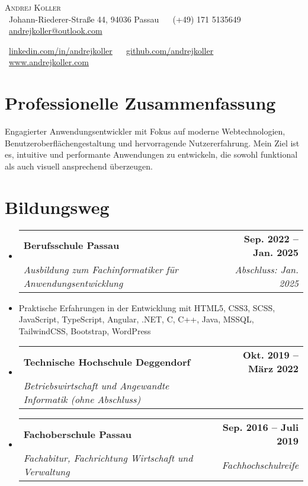 \documentclass[letterpaper,11pt]{article}
\makeatletter
\newcommand{\resumeItem}[1]{
  \item\small{
    {#1 \vspace{0pt}}
  }
}
\newcommand{\resumeSubheading}[4]{
  \vspace{-2pt}\item
  \begin{tabular*}{1.0\textwidth}[t]{l@{\extracolsep{\fill}}r}
    \textbf{#1} & \textbf{\small #2} \\
    \textit{\small#3} & \textit{\small #4} \\
  \end{tabular*}\vspace{-7pt}
}
\newcommand{\resumeSubHeadingListStart}{\begin{itemize}[leftmargin=0.0in, label={}]}
\newcommand{\resumeSubHeadingListEnd}{\end{itemize}\vspace{0pt}}
\newcommand{\resumeItemListStart}{\begin{itemize}}
\newcommand{\resumeItemListEnd}{\end{itemize}\vspace{-5pt}}
\makeatother
\begin{document}
\begin{center}
  {\Large \scshape Andrej Koller} \\[2mm]
  \footnotesize
  \faMapPin \ Johann-Riederer-Straße 44, 94036 Passau ~
  \faPhone\ (+49) 171 5135649 ~ 
  \faEnvelope\ \href{mailto:andrejkoller@outlook.com}{andrejkoller@outlook.com}
\end{center}

\begin{center}
  \footnotesize
  \faLinkedin\ \underline{\href{https://www.linkedin.com/in/andrejkoller}{linkedin.com/in/andrejkoller}} ~
  \faGithub\ \underline{\href{https://github.com/andrejkoller}{github.com/andrejkoller}} ~
  \faGlobe\ \underline{\href{https://www.andrejkoller.com}{www.andrejkoller.com}}
\end{center}

\section{Professionelle Zusammenfassung}
Engagierter Anwendungsentwickler mit Fokus auf moderne Webtechnologien, Benutzeroberflächengestaltung und hervorragende Nutzererfahrung. Mein Ziel ist es, intuitive und performante Anwendungen zu entwickeln, die sowohl funktional als auch visuell ansprechend überzeugen.

\section{Bildungsweg}
\resumeSubHeadingListStart
  \resumeSubheading
    {Berufsschule Passau}{Sep. 2022 – Jan. 2025}
    {Ausbildung zum Fachinformatiker für Anwendungsentwicklung}{Abschluss: Jan. 2025}
\resumeSubHeadingListEnd
\resumeItemListStart
  \resumeItem{Praktische Erfahrungen in der Entwicklung mit HTML5, CSS3, SCSS, JavaScript, TypeScript, Angular, .NET, C, C++, Java, MSSQL, TailwindCSS, Bootstrap, WordPress}
\resumeItemListEnd

\resumeSubHeadingListStart
  \resumeSubheading
    {Technische Hochschule Deggendorf}{Okt. 2019 – März 2022}
    {Betriebswirtschaft und Angewandte Informatik (ohne Abschluss)}{}
\resumeSubHeadingListEnd

\resumeSubHeadingListStart
  \resumeSubheading
    {Fachoberschule Passau}{Sep. 2016 – Juli 2019}
    {Fachabitur, Fachrichtung Wirtschaft und Verwaltung}{Fachhochschulreife}
\resumeSubHeadingListEnd

\end{document}
